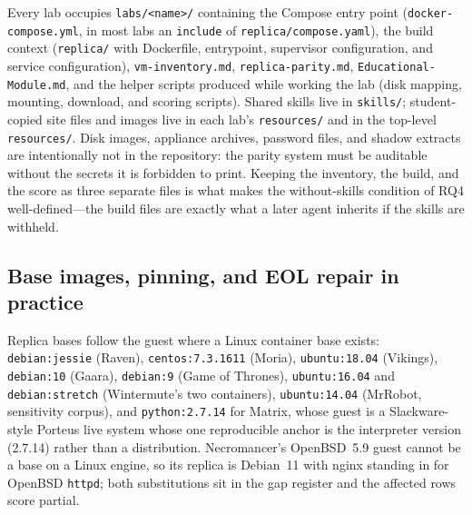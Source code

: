 \documentclass[3p,twocolumn,authoryear]{elsarticle}
\begin{document}
Every lab occupies \texttt{labs/<name>/} containing the Compose entry
point (\texttt{docker-compose.yml}, in most labs an \texttt{include} of
\texttt{replica/compose.yaml}), the build context (\texttt{replica/}
with Dockerfile, entrypoint, supervisor configuration, and service
configuration), \texttt{vm-inventory.md}, \texttt{replica-parity.md},
\texttt{Educational-Module.md}, and the helper scripts produced while
working the lab (disk mapping, mounting, download, and scoring
scripts). Shared skills live in \texttt{skills/}; student-copied site
files and images live in each lab's \texttt{resources/} and in the
top-level \texttt{resources/}. Disk images, appliance archives,
password files, and shadow extracts are intentionally not in the
repository: the parity system must be auditable without the secrets it
is forbidden to print. Keeping the inventory, the build, and the score
as three separate files is what makes the without-skills condition of
RQ4 well-defined---the build files are exactly what a later agent
inherits if the skills are withheld.

\subsection{Base images, pinning, and EOL repair in practice}

Replica bases follow the guest where a Linux container base exists:
\texttt{debian:jessie} (Raven), \texttt{centos:7.3.1611} (Moria),
\texttt{ubuntu:18.04} (Vikings), \texttt{debian:10} (Gaara),
\texttt{debian:9} (Game of Thrones), \texttt{ubuntu:16.04} and
\texttt{debian:stretch} (Wintermute's two containers),
\texttt{ubuntu:14.04} (MrRobot, sensitivity corpus), and
\texttt{python:2.7.14} for Matrix, whose guest is a Slackware-style
Porteus live system whose one reproducible anchor is the interpreter
version (2.7.14) rather than a distribution. Necromancer's OpenBSD~5.9
guest cannot be a base on a Linux engine, so its replica is Debian~11
with nginx standing in for OpenBSD \texttt{httpd}; both substitutions
sit in the gap register and the affected rows score partial.
\end{document}
